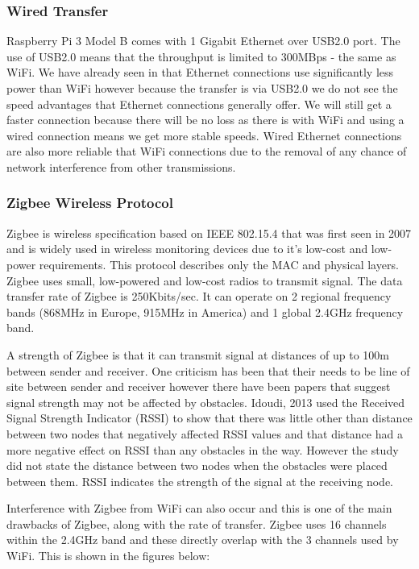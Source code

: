 \documentclass[10pt,a4paper]{article}
\begin{document}
\subsubsection{Wired Transfer}
Raspberry Pi 3 Model B comes with 1 Gigabit Ethernet over USB2.0 port. The use of USB2.0 means that the throughput is limited to 300MBps - the same as WiFi. We have already seen in\cite{Kaup2014} that Ethernet connections use significantly less power than WiFi however because the transfer is via USB2.0 we do not see the speed advantages that Ethernet connections generally offer. We will still get a faster connection because there will be no loss as there is with WiFi and using a wired connection means we get more stable speeds. Wired Ethernet connections are also more reliable that WiFi connections due to the removal of any chance of network interference from other transmissions.
\subsubsection{Zigbee Wireless Protocol}
Zigbee is wireless specification based on IEEE 802.15.4 that was first seen in 2007 and is widely used in wireless monitoring devices due to it's low-cost and low-power requirements. This protocol describes only the MAC and physical layers\cite{Elarabi2015}. Zigbee uses small, low-powered and low-cost radios to transmit signal. The data transfer rate of Zigbee is 250Kbits/sec. It can operate on 2 regional frequency bands (868MHz in Europe, 915MHz in America) and 1 global 2.4GHz frequency band\cite{ZigbeeAlliance}. 

A strength of Zigbee is that it can transmit signal at distances of up to 100m between sender and receiver. One criticism has been that their needs to be line of site between sender and receiver however there have been papers that suggest signal strength may not be affected by obstacles. Idoudi, 2013 used the Received Signal Strength Indicator (RSSI) to show that there was little other than distance between two nodes that negatively affected RSSI values and that distance had a more negative effect on RSSI than any obstacles in the way\cite{Idoudi2013}. However the study did not state the distance between two nodes when the obstacles were placed between them. RSSI indicates the strength of the signal at the receiving node. 

Interference with Zigbee from WiFi can also occur and this is one of the main drawbacks of Zigbee, along with the rate of transfer. Zigbee uses 16 channels within the 2.4GHz band and these directly overlap with the 3 channels used by WiFi. This is shown in the figures below:
\end{document}
